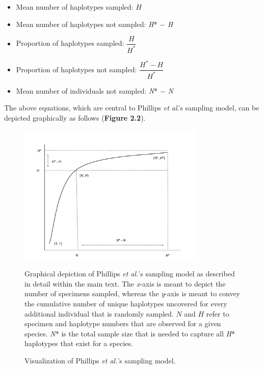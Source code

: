 \begin{itemize}

\item Mean number of haplotypes sampled: $H$

\vspace{1mm}

\item Mean number of haplotypes not sampled: \textit{H}* $-$ \textit{H}

\vspace{1mm}

\item Proportion of haplotypes sampled: $\dfrac{H}{H^*}$

\vspace{1mm}

\item Proportion of haplotypes not sampled: $\dfrac{H^*-H}{H^*}$

\vspace{1mm}

\item Mean number of individuals not sampled: \textit{N}* $-$ \textit{N}

\end{itemize}

\vspace{1mm}

\noindent The above equations, which are central to Phillips \textit{et al}.'s \cite{phillips2015exploration} sampling model, can be depicted graphically as follows (\textbf{Figure 2.2}).

\begin{figure}[H]
\centering
\includegraphics[width=0.8\textwidth]{Graph}
\caption{Visualization of Phillips \textit{et al.}'s \cite{phillips2015exploration} sampling model.}{Graphical depiction of Phillips \textit{et al.}'s \cite{phillips2015exploration} sampling model as described in detail within the main text. The \textit{x}-axis is meant to depict the number of specimens sampled, whereas the \textit{y}-axis is meant to convey the cumulative number of unique haplotypes uncovered for every additional individual that is randomly sampled. $N$ and $H$ refer to specimen and haplotype numbers that are observed for a given species. \textit{N}* is the total sample size that is needed to capture all \textit{H}* haplotypes that exist for a species.}
\end{figure}


